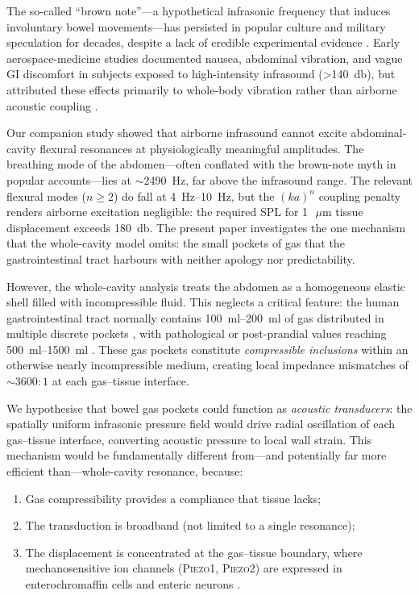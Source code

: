 \documentclass[12pt]{article}
\newcommand{\piezo}{\textsc{Piezo}}
\newcommand{\um}{\ensuremath{\,\mu\text{m}}}
\begin{document}
The so-called ``brown note''---a hypothetical infrasonic frequency that
induces involuntary bowel movements---has persisted in popular culture and
military speculation for decades, despite a lack of credible experimental
evidence \citep{Jauchem2007,Leventhall2007,SouthPark2000BrownNoise,MythBusters2005BrownNote}.  Early aerospace-medicine
studies documented nausea, abdominal vibration, and vague GI discomfort in
subjects exposed to high-intensity infrasound (\SI{>140}{\decibel}), but
attributed these effects primarily to whole-body vibration rather than
airborne acoustic coupling \citep{Mohr1965,vonGierke1974}.

Our companion study \citep{Mace2026browntone} showed that
airborne infrasound cannot excite abdominal-cavity flexural resonances at
physiologically meaningful amplitudes.  The breathing mode of the
abdomen---often conflated with the brown-note myth in popular accounts---lies at
$\sim$\SI{2490}{\hertz}, far above the infrasound range.  The relevant
flexural modes ($n \ge 2$) do fall at \SIrange{4}{10}{\hertz}, but the
$(ka)^n$ coupling penalty renders airborne excitation negligible: the
required SPL for \SI{1}{\um} tissue displacement exceeds
\SI{180}{\decibel}.
The present paper investigates the one mechanism that the whole-cavity
model omits: the small pockets of gas that the gastrointestinal tract
harbours with neither apology nor predictability.

However, the whole-cavity analysis treats the abdomen as a homogeneous
elastic shell filled with incompressible fluid.  This neglects a critical
feature: the human gastrointestinal tract normally contains
\SIrange{100}{200}{\milli\litre} of gas distributed in multiple discrete
pockets \citep{Levitt1971,Suarez1997}, with pathological or post-prandial
values reaching \SIrange{500}{1500}{\milli\litre}
\citep{Bedell1956,Serra2001}.  These gas pockets constitute
\emph{compressible inclusions} within an otherwise nearly incompressible
medium, creating local impedance mismatches of $\sim 3600{:}1$ at each
gas--tissue interface.

We hypothesise that bowel gas pockets could function as \emph{acoustic
transducers}: the spatially uniform infrasonic pressure field would drive
radial oscillation of each gas--tissue interface, converting acoustic
pressure to local wall strain.  This mechanism would be fundamentally
different from---and potentially far more efficient than---whole-cavity
resonance, because:
\begin{enumerate}
  \item Gas compressibility provides a compliance that tissue lacks;
  \item The transduction is broadband (not limited to a single resonance);
  \item The displacement is concentrated at the gas--tissue boundary, where
        mechanosensitive ion channels (\piezo1, \piezo2) are expressed in
        enterochromaffin cells and enteric neurons
        \citep{Coste2010,Alcaino2017,Zeitzschel2024}.
\end{enumerate}
\end{document}
